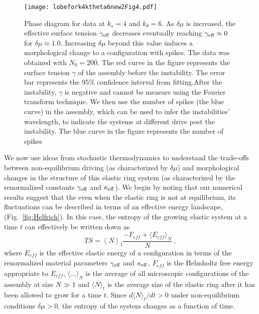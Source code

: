 \documentclass[amsmath,preprintnumbers,10pt,nofootinbib,prl,twocolumn]{revtex4-1}
\begin{document}
\begin{figure}[tbb]
\centering
\texttt{[image: lobefork4ktheta6new2Fig4.pdf]}
\caption{Phase diagram for data at $k_s=4$ and $k_\theta = 6$. As $\delta\mu$ is increased, the effective surface tension $\gamma_{\rm eff}$ decreases eventually reaching $\gamma_{\rm eff}\approx 0$ for $\delta\mu \approx 1.0$.  Increasing $\delta \mu$ beyond this value induces a morphological change to a configuration with spikes. The data was obtained with $N_0=200$. The red curve in the figure represents the surface tension $\gamma$ of the assembly before the instability. The error bar represents the 95\% confidence interval from fitting.After the instability, $\gamma$ is negative and cannot be measure using the Fourier transform technique. We then use the number of spikes (the blue curve) in the assembly, which can be used to infer the instabilities' wavelength, to indicate the systems at different drive post the instability. The blue curve in the figure represents the number of spikes} \label{fig:HelfrichInstability}
\end{figure}

We now use ideas from stochastic thermodynamics to understand the trade-offs between non-equilibrium driving (as characterized by $\delta \mu$) and morphological changes in the structure of this elastic ring system (as characterized by the renormalized constants $\gamma_{\rm eff}$ and $\kappa_{\rm eff}$). We begin by noting that our numerical results suggest that the even when the elastic ring is not at equilibrium, its fluctuations can be described in terms of an effective energy landscape, (Fig.~\ref{fig:Helfrich}). In this case, the entropy of the growing elastic system at a time $t$ can effectively be written down as~\cite{Nguyen2016,Esposito2012}
\begin{equation}
\label{eq:entropysystem}
 TS=\left\langle N \right\rangle_t \frac{-F_{\mathit{eff}} + \langle E_{\mathit{eff}} \rangle _N}{N}\,,
\end{equation}
where $E_{\mathit{eff}}$ is the effective elastic energy of a configuration in terms of the renormalized material parameters $\gamma_{\rm eff}$ and $\kappa_{\rm eff}$, $F_{\mathit{eff}}$ is the Helmholtz free energy appropriate to $E_{\mathit{eff}}$, $\langle...\rangle_N$ is the average of all microscopic configurations of the assembly at size $N\gg 1$ and $\langle N \rangle_t$ is the average size of the elastic ring after it has been allowed to grow for a time $t$. Since $d\langle N \rangle_t/dt > 0$ under non-equilibrium conditions $\delta\mu >0$, the entropy of the system changes as a function of time. 
\end{document}
